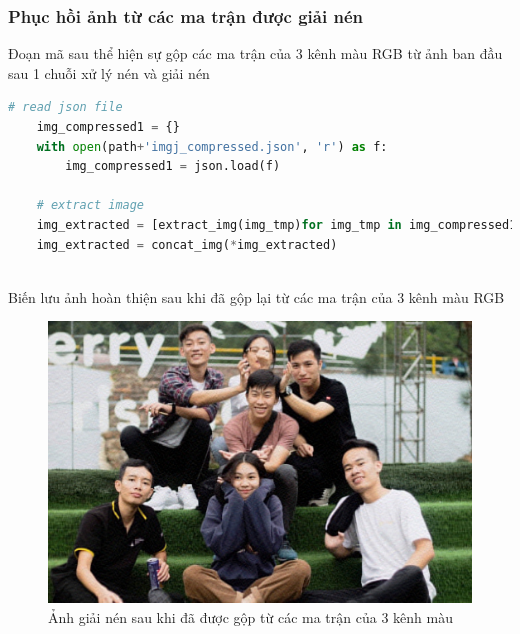 \subsubsection{Phục hồi ảnh từ các ma trận được giải nén}

Đoạn mã sau thể hiện sự gộp các ma trận của 3 kênh màu RGB từ ảnh ban đầu sau 1 chuỗi xử lý nén và giải nén

\begin{lstlisting}[language=Python]
    # read json file
    img_compressed1 = {}
    with open(path+'imgj_compressed.json', 'r') as f:
        img_compressed1 = json.load(f)

    # extract image
    img_extracted = [extract_img(img_tmp)for img_tmp in img_compressed1]
    img_extracted = concat_img(*img_extracted)
    
\end{lstlisting}

Biến  lưu ảnh hoàn thiện sau khi đã gộp lại từ các ma trận của 3 kênh màu RGB

\begin{center}
    \begin{figure}[htp]
        \begin{center}
            \includegraphics[width=\textwidth,height=\textheight,keepaspectratio]{Chapters/content/27_pca/imgg_extracted.jpg}
        \end{center}
        \caption{Ảnh giải nén sau khi đã được gộp từ các ma trận của 3 kênh màu}
        \label{fig:27_8}
    \end{figure}
\end{center}



\newpage
